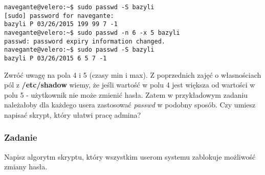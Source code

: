 \documentclass[a4paper,titlepage,12pt]{mwart}
\begin{document}
\begin{verbatim}
navegante@velero:~$ sudo passwd -S bazyli
[sudo] password for navegante: 
bazyli P 03/26/2015 199 99 7 -1
navegante@velero:~$ sudo passwd -n 6 -x 5 bazyli
passwd: password expiry information changed.
navegante@velero:~$ sudo passwd -S bazyli
bazyli P 03/26/2015 6 5 7 -1
\end{verbatim}
Zwróć uwagę na pola 4 i 5 (czasy min i max). Z poprzednich zajęć o własnościach pól z \textbf{/etc/shadow} wiemy, że jeśli wartość w polu 4 jest większa od wartości w polu 5 - użytkownik nie może zmienić hasła. Zatem w przykładowym zadaniu należałoby dla każdego usera zastosować \textit{passwd} w podobny sposób. Czy umiesz napisać skrypt, który ułatwi pracę admina?
\subsubsection{Zadanie}
Napisz algorytm skryptu, który wszystkim userom systemu zablokuje możliwość zmiany hasła.
\end{document}
